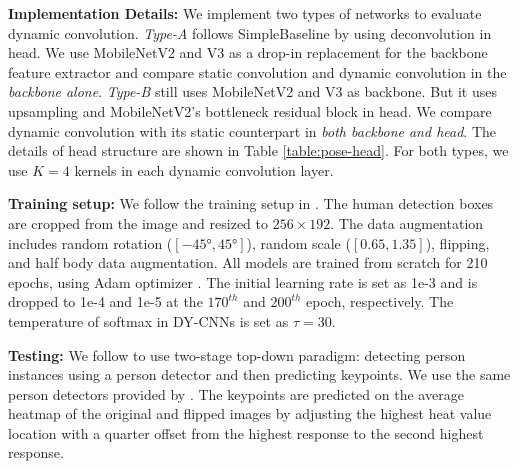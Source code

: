 \documentclass[10pt,twocolumn,letterpaper]{article}
\begin{document}
\noindent \textbf{Implementation Details:} We implement two types of networks to evaluate dynamic convolution. \textit{Type-A} follows SimpleBaseline \cite{xiao2018simplebaseline} by using deconvolution in head. We use MobileNetV2 and V3 as a drop-in replacement for the backbone feature extractor and compare static convolution and dynamic convolution in the \textit{backbone alone}. \textit{Type-B} still uses MobileNetV2 and V3 as backbone. But it uses upsampling and MobileNetV2's bottleneck residual block in head. We compare dynamic convolution with its static counterpart in \textit{both backbone and head}. The details of head structure are shown in Table \ref{table:pose-head}. For both types, we use $K=4$ kernels in each dynamic convolution layer.



\noindent \textbf{Training setup:} We follow the training setup in \cite{sun2019deep}. The human detection boxes are cropped from the image and resized to $256\times192$. The data augmentation includes random rotation ($[-\ang{45}, \ang{45}]$), random scale ($[0.65, 1.35]$), flipping, and half body data augmentation. All models are trained from scratch for 210 epochs, using Adam optimizer \cite{kingma:adam}. The initial learning rate is set as 1e-3 and is dropped to 1e-4 and 1e-5 at the $170^{th}$ and $200^{th}$ epoch, respectively. The temperature of softmax in DY-CNNs is set as $\tau=30$.

\noindent \textbf{Testing:} We follow \cite{xiao2018simplebaseline, sun2019deep} to use two-stage top-down paradigm: detecting person instances using a person detector and then predicting keypoints. We use the same person detectors provided by \cite{xiao2018simplebaseline}. The keypoints are predicted on the average heatmap of the original and flipped images by adjusting the highest heat value location with a quarter offset from the highest response to the second highest response.
\end{document}
